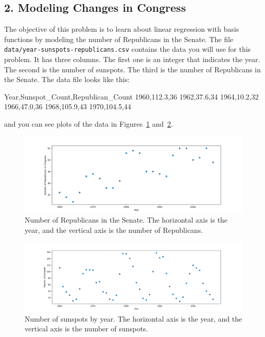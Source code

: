 \documentclass[submit]{harvardml}
\begin{document}
\subsection*{2. Modeling Changes in Congress}
 The objective of this problem is to learn about linear regression
 with basis functions by modeling the number of Republicans in the
 Senate. The file \verb|data/year-sunspots-republicans.csv| contains the
 data you will use for this problem.  It has three columns.  The first
 one is an integer that indicates the year.  The second is the number
 of sunspots.  The third is the number of Republicans in the Senate.
 The data file looks like this:
 \begin{csv}
Year,Sunspot_Count,Republican_Count
1960,112.3,36
1962,37.6,34
1964,10.2,32
1966,47.0,36
1968,105.9,43
1970,104.5,44
\end{csv}
and you can see plots of the data in Figures~\ref{fig:congress}
and~\ref{fig:sunspots}.

\begin{figure}[h]
\centering
\includegraphics[width=\textwidth]{data/year-republicans}
\caption{Number of Republicans in the Senate.  The horizontal axis is the year, and the vertical axis is the number of Republicans.}
\label{fig:congress}
\end{figure}

\begin{figure}[h]
\centering
\includegraphics[width=\textwidth]{data/year-sunspots}
\caption{Number of sunspots by year.  The horizontal axis is the year, and the vertical axis is the number of sunspots.}
\label{fig:sunspots}
\end{figure}
\end{document}
